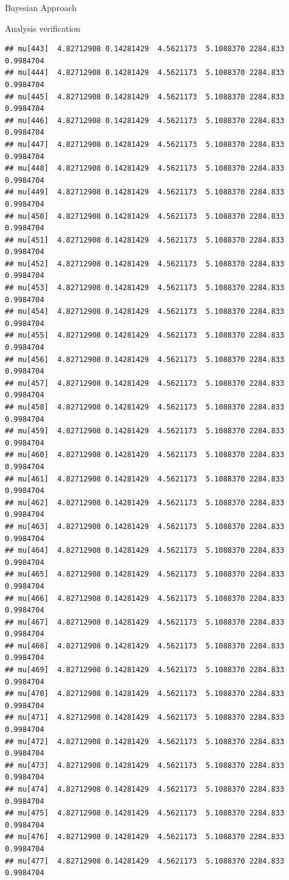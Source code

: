 \documentclass[
  ignorenonframetext,
]{beamer}
\begin{document}
\begin{frame}[fragile]{Bayesian Approach}
\begin{block}{Analysis verification}
\begin{verbatim}
## mu[443]  4.82712908 0.14281429  4.5621173  5.1088370 2284.833 0.9984704
## mu[444]  4.82712908 0.14281429  4.5621173  5.1088370 2284.833 0.9984704
## mu[445]  4.82712908 0.14281429  4.5621173  5.1088370 2284.833 0.9984704
## mu[446]  4.82712908 0.14281429  4.5621173  5.1088370 2284.833 0.9984704
## mu[447]  4.82712908 0.14281429  4.5621173  5.1088370 2284.833 0.9984704
## mu[448]  4.82712908 0.14281429  4.5621173  5.1088370 2284.833 0.9984704
## mu[449]  4.82712908 0.14281429  4.5621173  5.1088370 2284.833 0.9984704
## mu[450]  4.82712908 0.14281429  4.5621173  5.1088370 2284.833 0.9984704
## mu[451]  4.82712908 0.14281429  4.5621173  5.1088370 2284.833 0.9984704
## mu[452]  4.82712908 0.14281429  4.5621173  5.1088370 2284.833 0.9984704
## mu[453]  4.82712908 0.14281429  4.5621173  5.1088370 2284.833 0.9984704
## mu[454]  4.82712908 0.14281429  4.5621173  5.1088370 2284.833 0.9984704
## mu[455]  4.82712908 0.14281429  4.5621173  5.1088370 2284.833 0.9984704
## mu[456]  4.82712908 0.14281429  4.5621173  5.1088370 2284.833 0.9984704
## mu[457]  4.82712908 0.14281429  4.5621173  5.1088370 2284.833 0.9984704
## mu[458]  4.82712908 0.14281429  4.5621173  5.1088370 2284.833 0.9984704
## mu[459]  4.82712908 0.14281429  4.5621173  5.1088370 2284.833 0.9984704
## mu[460]  4.82712908 0.14281429  4.5621173  5.1088370 2284.833 0.9984704
## mu[461]  4.82712908 0.14281429  4.5621173  5.1088370 2284.833 0.9984704
## mu[462]  4.82712908 0.14281429  4.5621173  5.1088370 2284.833 0.9984704
## mu[463]  4.82712908 0.14281429  4.5621173  5.1088370 2284.833 0.9984704
## mu[464]  4.82712908 0.14281429  4.5621173  5.1088370 2284.833 0.9984704
## mu[465]  4.82712908 0.14281429  4.5621173  5.1088370 2284.833 0.9984704
## mu[466]  4.82712908 0.14281429  4.5621173  5.1088370 2284.833 0.9984704
## mu[467]  4.82712908 0.14281429  4.5621173  5.1088370 2284.833 0.9984704
## mu[468]  4.82712908 0.14281429  4.5621173  5.1088370 2284.833 0.9984704
## mu[469]  4.82712908 0.14281429  4.5621173  5.1088370 2284.833 0.9984704
## mu[470]  4.82712908 0.14281429  4.5621173  5.1088370 2284.833 0.9984704
## mu[471]  4.82712908 0.14281429  4.5621173  5.1088370 2284.833 0.9984704
## mu[472]  4.82712908 0.14281429  4.5621173  5.1088370 2284.833 0.9984704
## mu[473]  4.82712908 0.14281429  4.5621173  5.1088370 2284.833 0.9984704
## mu[474]  4.82712908 0.14281429  4.5621173  5.1088370 2284.833 0.9984704
## mu[475]  4.82712908 0.14281429  4.5621173  5.1088370 2284.833 0.9984704
## mu[476]  4.82712908 0.14281429  4.5621173  5.1088370 2284.833 0.9984704
## mu[477]  4.82712908 0.14281429  4.5621173  5.1088370 2284.833 0.9984704

\end{verbatim}
\end{block}
\end{frame}
\end{document}

